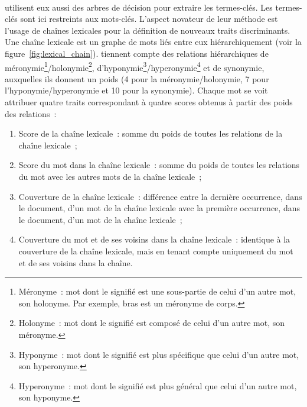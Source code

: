         ~\\ utilisent eux aussi des arbres de
        décision pour extraire les termes-clés. Les termes-clés sont ici
        restreints aux mots-clés. L'aspect novateur de leur méthode est l'usage
        de chaînes lexicales pour la définition de nouveaux traits
        discriminants. Une chaîne lexicale est un graphe de mots liés entre eux
        hiérarchiquement (voir la figure~\ref{fig:lexical_chain}).
         tiennent compte des relations
        hiérarchiques de méronymie\footnote{Méronyme~: mot dont le signifié est
        une sous-partie de celui d'un autre mot, son holonyme. Par exemple,
        \og{}bras\fg{} est un méronyme de
        \og{}corps\fg{}.}/holonymie\footnote{Holonyme~: mot dont le signifié est
        composé de celui d'un autre mot, son méronyme.},
        d'hyponymie\footnote{Hyponyme~: mot dont le signifié est
        plus spécifique que celui d'un autre mot, son
        hyperonyme.}/hyperonymie\footnote{Hyperonyme~: mot dont le signifié est
        plus général que celui d'un autre mot, son hyponyme.} et de synonymie,
        auxquelles ils donnent un poids (4 pour la méronymie/holonymie, 7 pour
        l'hyponymie/hyperonymie et 10 pour la synonymie). Chaque mot se voit
        attribuer quatre traits correspondant à quatre scores obtenus à partir
        des poids des relations~:
        \begin{enumerate}
          \item{Score de la chaîne lexicale~: somme du poids de toutes les
                relations de la chaîne lexicale~;}
          \item{Score du mot dans la chaîne lexicale~: somme du poids de toutes
                les relations du mot avec les autres mots de la chaîne
                lexicale~;}
          \item{Couverture de la chaîne lexicale~: différence entre la dernière
                occurrence, dans le document, d'un mot de la chaîne lexicale
                avec la première occurrence, dans le document, d'un mot de la
                chaîne lexicale~;}
          \item{Couverture du mot et de ses voisins dans la chaîne lexicale~:
                identique à la couverture de la chaîne lexicale, mais en tenant
                compte uniquement du mot et de ses voisins dans la chaîne.}
        \end{enumerate}
